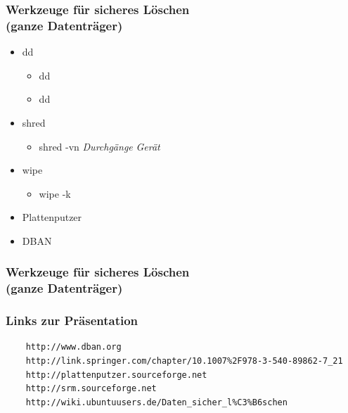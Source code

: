 \begin{frame}
  \frametitle{Werkzeuge für sicheres Löschen\\(ganze Datenträger)}
  \begin{itemize}
    \item dd
      \begin{itemize}
        \item dd  
        \item dd  
      \end{itemize}
    \item shred
      \begin{itemize}
        \item shred -vn \textit{Durchgänge} \textit{Gerät}
      \end{itemize}
    \item wipe
      \begin{itemize}
        \item wipe -k 
      \end{itemize}
    \item Plattenputzer
    \item DBAN
  \end{itemize}
\end{frame}

\begin{frame}
  \frametitle{Werkzeuge für sicheres Löschen\\(ganze Datenträger)}
\end{frame}

\begin{frame}[fragile]   %
\frametitle{Links zur Präsentation}
  \begin{verbatim}
    http://www.dban.org
    http://link.springer.com/chapter/10.1007%2F978-3-540-89862-7_21
    http://plattenputzer.sourceforge.net
    http://srm.sourceforge.net
    http://wiki.ubuntuusers.de/Daten_sicher_l%C3%B6schen
  \end{verbatim}
\end{frame}

